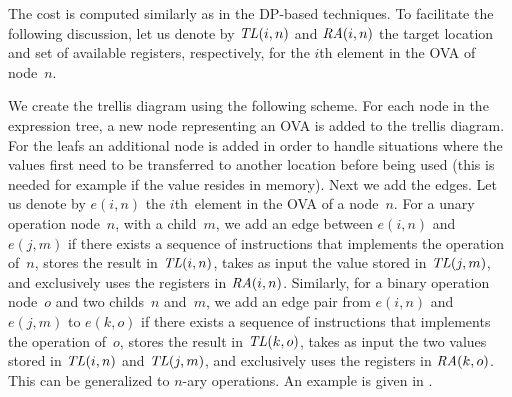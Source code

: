 %
The cost is computed similarly as in the \gls{DP}-based techniques.
%
To facilitate the following discussion, let us denote by \mbox{$\mathit{TL}(i, n)$} and
\mbox{$\mathit{RA}(i, n)$} the target location and set of available \glspl{register},
respectively, for the $i$th element in the \gls{OVA} of node~$n$.

We create the \gls{trellis diagram} using the following scheme.
%
For each \gls{node} in the \gls{expression tree}, a new \gls{node} representing
an \gls{OVA} is added to the \gls{trellis diagram}.
%
For the \glspl{leaf} an additional \gls{node} is added in order to handle
situations where the values first need to be transferred to another location
before being used (this is needed for example if the value resides in memory).
%
Next we add the \glspl{edge}.
%
Let us denote by \mbox{$e(i, n)$} the $i$th~element in the \gls{OVA} of a
\gls{node}~$n$.
%
For a unary operation \gls{node}~$n$, with a \gls{child}~$m$, we add an
\gls{edge} between \mbox{$e(i, n)$} and \mbox{$e(j, m)$} if there exists a
sequence of \glspl{instruction} that implements the operation of~$n$, stores the
result in \mbox{$\mathit{TL}(i, n)$}, takes as input the value stored in \mbox{$\mathit{TL}(j,
  m)$}, and exclusively uses the \glspl{register} in \mbox{$\mathit{RA}(i, n)$}.
%
Similarly, for a binary operation \gls{node}~$o$ and two \glspl{child}~$n$
and~$m$, we add an \gls{edge} pair from \mbox{$e(i, n)$} and \mbox{$e(j, m)$} to
\mbox{$e(k, o)$} if there exists a sequence of \glspl{instruction} that
implements the operation of~$o$, stores the result in \mbox{$\mathit{TL}(k, o)$}, takes
as input the two values stored in \mbox{$\mathit{TL}(i, n)$} and \mbox{$\mathit{TL}(j, m)$},
and exclusively uses the \glspl{register} in \mbox{$\mathit{RA}(k, o)$}.
%
This can be generalized to \mbox{$n$-ary} operations.
%
An example is given in .

